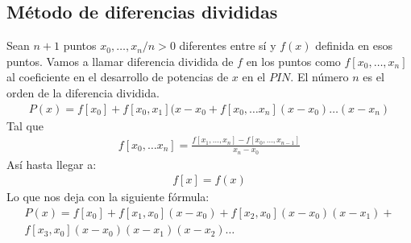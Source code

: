 \documentclass{article}
\begin{document}
\subsection{Método de diferencias divididas}
Sean $n+1$ puntos $x_{0},\dots ,x_{n} / n > 0$ diferentes entre sí
y $f(x)$ definida en esos puntos. Vamos a llamar diferencia dividida de $f$ en los puntos
como $f[x_{0},\dots ,x_{n}]$ al coeficiente en el desarrollo de
potencias de $x$ en el $PIN$. El número $n$ es el orden de la diferencia dividida.
\begin{equation}
	\begin{split}
		P(x)=f[x_{0}]+f[x_{0},x_{1}](x-x_{0}
		+ f[x_{0},\dots x_{n}](x-x_{0})\dots (x-x_{n})
	\end{split}
\end{equation}
Tal que
\begin{equation}
	\begin{split}
		f[x_{0},\dots x_{n}] =
		\frac{f[x_{1},\dots, x_{n}]-
		f[x_{0},\dots, x_{n-1}]}{x_{n}-x_{0}}
	\end{split}
\end{equation}
Así hasta llegar a:
\begin{equation}
	\begin{split}
		f[x]=f(x)
	\end{split}
\end{equation}
Lo que nos deja con la siguiente fórmula:
\begin{equation}
	\begin{split}
		P(x) = f[x_{0}] + f[x_{1},x_{0}](x-x_{0})+f[x_{2},x_{0}](x-x_{0})(x-x_{1})
		+ \\f[x_{3},x_{0}](x-x_{0})(x-x_{1})(x-x_{2})\dots 
	\end{split}
\end{equation}
\end{document}
